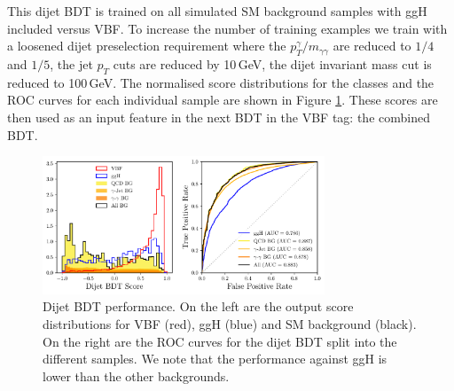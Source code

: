 This dijet BDT is trained on all simulated SM background samples with ggH included versus VBF. To increase the number of training examples we train with a loosened dijet preselection requirement where the $p_{T}^{\gamma}/m_{\gamma\gamma}$ are reduced to $1/4$ and $1/5$, the jet $p_T$ cuts are reduced by 10\,GeV, the dijet invariant mass cut is reduced to 100\,GeV.
The normalised score distributions for the classes and the ROC curves for each individual sample are shown in Figure \ref{fig:event_categorisaton:dijet_bdt_performance}.
These scores are then used as an input feature in the next BDT in the VBF tag: the combined BDT. 
\begin{figure}[h!]
        \includegraphics[width=0.75\textwidth]{figures/event_selection/dijet_BDT_PS.pdf}
    \caption{Dijet BDT performance. On the left are the output score distributions for VBF (red), ggH (blue) and SM background (black). On the right are the ROC curves for the dijet BDT split into the different samples. We note that the performance against ggH is lower than the other backgrounds.}
    \label{fig:event_categorisaton:dijet_bdt_performance}
\end{figure}









